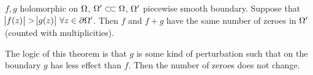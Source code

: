 
\begin{theorem}[Rouché]

$f,g$ holomorphic on $\Omega$, $\om' \ssubset \om$, $\Omega ' $ piecewise smooth boundary. Suppose that $\abs{f(z)} > \abs{g(z)} \, \forall z \in \partial \Omega '$. Then $f $ and $f+g$ have the same number of zeroes in $\Omega ' $ (counted with multiplicities).

\end{theorem}

\begin{note}

The logic of this theorem is that $g$ is some kind of perturbation such that on the boundary $g$ has less effect than $f$. Then the number of zeroes does not change.

\end{note}

